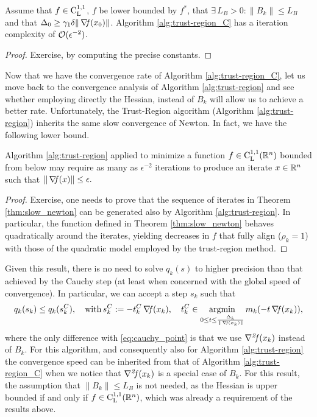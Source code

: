 \documentclass[10pt,a4paper]{article}
\begin{document}
\begin{theorem}
	Assume that $f\in \mathord{\mathrm{C^{1,1}_{L}}}$, $f$ be lower bounded by $f^*$, that $\exists\, L_B>0: \|B_k\| \leq L_B$ and that $\Delta_0\geq \gamma_1 \delta \|\operatorname*{\mathit{\nabla \!f}}(x_0)\|$. Algorithm \ref{alg:trust-region_C} has a iteration complexity of $\mathcal{O}(\epsilon^{-2})$.
\end{theorem}
\begin{proof}
	Exercise, by computing the precise constants.
\end{proof}
Now that we have the convergence rate of Algorithm \ref{alg:trust-region_C}, let us move back to the convergence analysis of Algorithm \ref{alg:trust-region} and see whether employing directly the Hessian, instead of $B_k$ will allow us to achieve a better rate. Unfortunately, the Trust-Region algorithm (Algorithm \ref{alg:trust-region}) inherits the same slow convergence of Newton. In fact, we have the following lower bound.

\begin{theorem}\label{thm:slow_trust_region}
	Algorithm \ref{alg:trust-region} applied to minimize a function $f\in \mathord{\mathrm{C^{1,1}_{L}}}(\mathbb{R}^n)$ bounded from below may require as many as $\epsilon^{-2}$ iterations to produce an iterate $x\in \mathbb{R}^n$ such that $||\operatorname*{\mathit{\nabla \!f}} (x)\|\leq \epsilon.$
\end{theorem}
\begin{proof}
	Exercise, one needs to prove that the sequence of iterates in Theorem \ref{thm:slow_newton} can be generated also by Algorithm \ref{alg:trust-region}. In particular, the function defined in Theorem \ref{thm:slow_newton} behaves quadratically around the iterates, yielding decreases in $f$ that fully align ($\rho_k=1$) with those of the quadratic model employed by the trust-region method.
\end{proof}
Given this result, there is no need to solve $q_k(s)$ to higher precision than that achieved by the Cauchy step (at least when concerned with the global speed of convergence). In particular, we can accept a step $s_k$ such that 
\begin{equation*}
	q_k(s_k) \leq q_k(s_k^C), \quad \mathord{\mathrm{with }}\, s_k^C:= -t_k^C\operatorname*{\mathit{\nabla \!f}}(x_k), \quad t_k^C \in \operatorname*{argmin}_{0\leq t\leq \frac{\Delta_k}{\|\operatorname*{\mathit{\nabla \!f}}(x_k)\|}} m_k(-t\operatorname*{\mathit{\nabla \!f}}(x_k)),
\end{equation*}
where the only difference with \eqref{eq:cauchy_point} is that we use $\operatorname*{\mathit{\nabla^2 \!f}}(x_k)$ instead of $B_k$. For this algorithm, and consequently also for Algorithm \ref{alg:trust-region} the convergence speed can be inherited from that of Algorithm \ref{alg:trust-region_C} when we notice that $\operatorname*{\mathit{\nabla^2 \!f}}(x_k)$ is a special case of $B_k$. For this result, the assumption that $\|B_k\|\leq L_B$ is not needed, as the Hessian is upper bounded if and only if $f\in \mathord{\mathrm{C^{1,1}_{L}}}(\mathbb{R}^n)$, which was already a requirement of the results above. 
\end{document}
